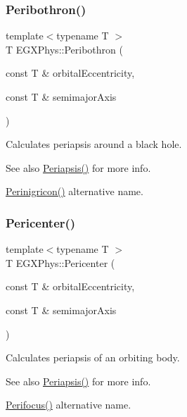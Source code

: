 \subsubsection{\texorpdfstring{Peribothron()}{Peribothron()}}
{\footnotesize\ttfamily template$<$typename T $>$ \\
T E\+G\+X\+Phys\+::\+Peribothron (\begin{DoxyParamCaption}\item[{const T \&}]{orbital\+Eccentricity,  }\item[{const T \&}]{semimajor\+Axis }\end{DoxyParamCaption})}



Calculates periapsis around a black hole. 

\begin{DoxySeeAlso}{See also}
\hyperlink{group___periapsis_ga4414ac75539371ec874a3d25cad6c9fe}{Periapsis()} for more info. 

\hyperlink{group___periapsis_ga99d86af90179994e17158b082c502fd4}{Perinigricon()} alternative name. 
\end{DoxySeeAlso}
\mbox{\label{group___periapsis_gac4c419a87a5802cf6afc98f50792e99f}} 
\subsubsection{\texorpdfstring{Pericenter()}{Pericenter()}}
{\footnotesize\ttfamily template$<$typename T $>$ \\
T E\+G\+X\+Phys\+::\+Pericenter (\begin{DoxyParamCaption}\item[{const T \&}]{orbital\+Eccentricity,  }\item[{const T \&}]{semimajor\+Axis }\end{DoxyParamCaption})}



Calculates periapsis of an orbiting body. 

\begin{DoxySeeAlso}{See also}
\hyperlink{group___periapsis_ga4414ac75539371ec874a3d25cad6c9fe}{Periapsis()} for more info. 

\hyperlink{group___periapsis_gaff62669fb364a245cb85f9a91d8ea71f}{Perifocus()} alternative name. 
\end{DoxySeeAlso}
\mbox{\label{group___periapsis_ga12b5e99aa2e3e7031ef6ce93060cf516}} 
